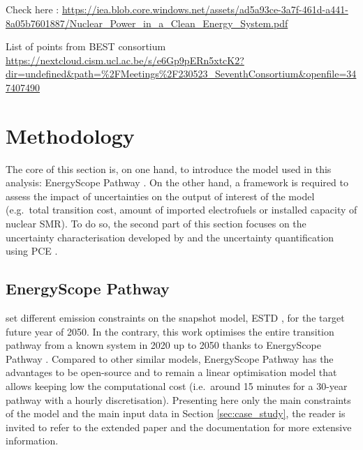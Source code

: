 \documentclass[11pt,twoside,a4paper,english]{article}
\def\eg{e.g.\ }
\def\ie{i.e.\ }
\begin{document}
Check here : \url{https://iea.blob.core.windows.net/assets/ad5a93ce-3a7f-461d-a441-8a05b7601887/Nuclear_Power_in_a_Clean_Energy_System.pdf}

List of points from BEST consortium \url{https://nextcloud.cism.ucl.ac.be/s/e6Gp9pERn5xtcK2?dir=undefined&path=%2FMeetings%2F230523_SeventhConsortium&openfile=347407490}


\section{Methodology}
\label{sec:methodo}
The core of this section is, on one hand, to introduce the model used in this analysis: EnergyScope Pathway \cite{limpens2023pathway}. On the other hand, a framework is required to assess the impact of uncertainties on the output of interest of the model (\eg total transition cost, amount of imported electrofuels or installed capacity of nuclear SMR). To do so, the second part of this section focuses on the uncertainty characterisation developed by \citet{Moret2017} and the uncertainty quantification using \acrfull{PCE} \cite{Sudret2014}.

\subsection{EnergyScope Pathway}
\label{subsec:meth:ES_Pathway}
\citet{rixhon2021role} set different emission constraints on the snapshot model, \gls{ESTD} \cite{limpens2019energyscope}, for the target future year of 2050. In the contrary, this work optimises the entire transition pathway from a known system in 2020 up to 2050 thanks to EnergyScope Pathway \cite{limpens2023pathway}. Compared to other similar models, EnergyScope Pathway has the advantages to be open-source and to remain a linear optimisation model that allows keeping low the computational cost (\ie around 15 minutes for a 30-year pathway with a hourly discretisation). Presenting here only the main constraints of the model and the main input data in Section \ref{sec:case_study}, the reader is invited to refer to the extended paper \cite{limpens2023pathway} and the documentation \cite{readthedocs_pathway} for more extensive information.
\end{document}
